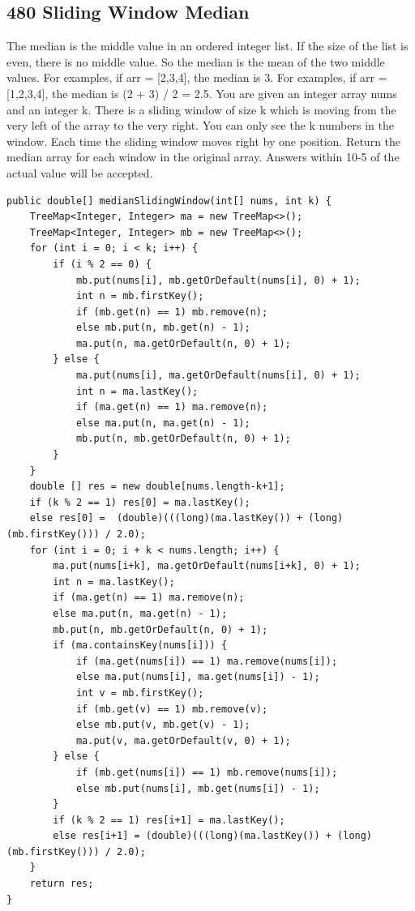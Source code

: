 \documentclass[9pt, b5paaper]{book}
\begin{document}
\subsection{480 Sliding Window Median}
\label{sec-5-0-19}
The median is the middle value in an ordered integer list. If the size of the list is even, there is no middle value. So the median is the mean of the two middle values.
For examples, if arr = [2,3,4], the median is 3.
For examples, if arr = [1,2,3,4], the median is (2 + 3) / 2 = 2.5.
You are given an integer array nums and an integer k. There is a sliding window of size k which is moving from the very left of the array to the very right. You can only see the k numbers in the window. Each time the sliding window moves right by one position.
Return the median array for each window in the original array. Answers within 10-5 of the actual value will be accepted.
\begin{verbatim}
public double[] medianSlidingWindow(int[] nums, int k) {
    TreeMap<Integer, Integer> ma = new TreeMap<>();
    TreeMap<Integer, Integer> mb = new TreeMap<>();
    for (int i = 0; i < k; i++) {
        if (i % 2 == 0) {
            mb.put(nums[i], mb.getOrDefault(nums[i], 0) + 1);
            int n = mb.firstKey();
            if (mb.get(n) == 1) mb.remove(n);
            else mb.put(n, mb.get(n) - 1);
            ma.put(n, ma.getOrDefault(n, 0) + 1);
        } else {
            ma.put(nums[i], ma.getOrDefault(nums[i], 0) + 1);
            int n = ma.lastKey();
            if (ma.get(n) == 1) ma.remove(n);
            else ma.put(n, ma.get(n) - 1);
            mb.put(n, mb.getOrDefault(n, 0) + 1);
        }
    }
    double [] res = new double[nums.length-k+1];
    if (k % 2 == 1) res[0] = ma.lastKey();
    else res[0] =  (double)(((long)(ma.lastKey()) + (long)(mb.firstKey())) / 2.0);
    for (int i = 0; i + k < nums.length; i++) {
        ma.put(nums[i+k], ma.getOrDefault(nums[i+k], 0) + 1);
        int n = ma.lastKey();
        if (ma.get(n) == 1) ma.remove(n);
        else ma.put(n, ma.get(n) - 1);
        mb.put(n, mb.getOrDefault(n, 0) + 1);
        if (ma.containsKey(nums[i])) {
            if (ma.get(nums[i]) == 1) ma.remove(nums[i]);
            else ma.put(nums[i], ma.get(nums[i]) - 1);
            int v = mb.firstKey();
            if (mb.get(v) == 1) mb.remove(v);
            else mb.put(v, mb.get(v) - 1);
            ma.put(v, ma.getOrDefault(v, 0) + 1);
        } else {
            if (mb.get(nums[i]) == 1) mb.remove(nums[i]);
            else mb.put(nums[i], mb.get(nums[i]) - 1);
        }
        if (k % 2 == 1) res[i+1] = ma.lastKey();
        else res[i+1] = (double)(((long)(ma.lastKey()) + (long)(mb.firstKey())) / 2.0);
    }
    return res;
}
\end{verbatim}
\end{document}
